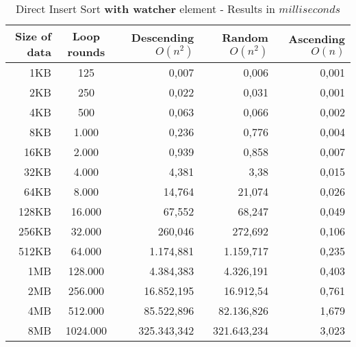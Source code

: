 \documentclass[11pt]{amsart}
\begin{document}
\begin{table}[htdp]
	\caption{Direct Insert Sort \textbf{with watcher} element - Results in $milliseconds$}
	\begin{tabular}{|r|c|r|r|r|} \hline
		Size of data & Loop rounds & \parbox[c]{3.5cm}{Descending \\ $O(n^2)$} & \parbox[c]{3.5cm}{Random \\$O(n^2)$} & \parbox[c]{3.5cm}{Ascending \\ $O(n)$} \\ \hline
		1KB & 125 & 0,007 & 0,006 & 0,001 \\ \hline
		2KB & 250 & 0,022 & 0,031 & 0,001 \\ \hline
		4KB & 500 & 0,063 & 0,066 & 0,002 \\ \hline
		8KB & 1.000 & 0,236 & 0,776 & 0,004 \\ \hline
		16KB & 2.000 & 0,939 & 0,858 & 0,007 \\ \hline
		32KB & 4.000 & 4,381 & 3,38 & 0,015 \\ \hline
		64KB & 8.000 & 14,764 & 21,074 & 0,026 \\ \hline
		128KB & 16.000 & 67,552 & 68,247 & 0,049 \\ \hline
		256KB & 32.000 & 260,046 & 272,692 & 0,106 \\ \hline
		512KB & 64.000 & 1.174,881 & 1.159,717 & 0,235 \\ \hline
		1MB & 128.000 & 4.384,383 & 4.326,191 & 0,403 \\ \hline
		2MB & 256.000 & 16.852,195 & 16.912,54 & 0,761 \\ \hline
		4MB & 512.000 & 85.522,896 & 82.136,826 & 1,679 \\ \hline
		8MB & 1024.000 & 325.343,342 & 321.643,234 & 3,023 \\ \hline
	\end{tabular}
	\label{default}
\end{table}%
\end{document}
